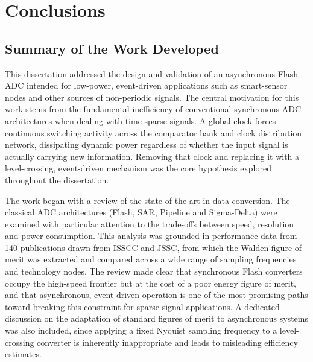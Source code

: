 \chapter{Conclusions}
\label{chap:Conclusions}

\section{Summary of the Work Developed}

This dissertation addressed the design and validation of an asynchronous Flash
ADC intended for low-power, event-driven applications such as smart-sensor
nodes and other sources of non-periodic signals. The central motivation for
this work stems from the fundamental inefficiency of conventional synchronous ADC
architectures when dealing with time-sparse signals. A global clock forces continuous switching
activity across the comparator bank and clock distribution network, dissipating dynamic power
regardless of whether the input signal is actually carrying new information. Removing that clock
and replacing it with a level-crossing, event-driven mechanism was the core hypothesis explored
throughout the dissertation.

The work began with a review of the state of the art in data conversion. The classical
ADC architectures (Flash, SAR, Pipeline and Sigma-Delta) were examined with particular
attention to the trade-offs between speed, resolution and power consumption. This analysis was
grounded in performance data from 140 publications drawn from ISSCC and JSSC, from which
the Walden figure of merit was extracted and compared across a wide range of sampling
frequencies and technology nodes. The review made clear that synchronous Flash converters
occupy the high-speed frontier but at the cost of a poor energy figure of merit, and that
asynchronous, event-driven operation is one of the most promising paths toward breaking this
constraint for sparse-signal applications. A dedicated discussion on the adaptation of standard
figures of merit to asynchronous systems was also included, since applying a fixed Nyquist
sampling frequency to a level-crossing converter is inherently inappropriate and leads to
misleading efficiency estimates.

